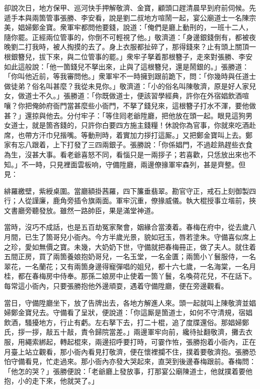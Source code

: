 卻說次日，地方保甲、巡河快手押解敬濟、金寶，顧頭口趕清晨早到府前伺候。先遞手本與兩箇管事張勝、李安看，說是劉二叔地方喧鬧一起，宴公廟道士一名陳宗美，娼婦鄭金寶。衆軍牢都問他要錢，說道：「俺們是廳上動刑的，一班十二人，隨你罷。正經兩位管事的，你倒不可輕視了他。」敬濟道：「身邊銀錢倒有，都被夜晚劉二打我時，被人掏摸的去了。身上衣服都扯碎了，那得錢來？止有頭上關頂一根銀簪兒，拔下來，與二位管事的罷。」{}衆牢子拏着那根簪子，走來對張勝、李安如此這般說：「他一箇錢兒不拏出來，止與了這根簪兒，還是鬧銀的。」張勝道：「你叫他近前，等我審問他。」衆軍牢不一時擁到跟前跪下，問：「你幾時與任道士做徒弟？俗名叫甚麼？我從未見你。」敬濟道：「小的俗名叫陳敬濟，原是好人家兒女，做道士不久。」張勝道：「你既做道士，便該習學經典，許你在外宿娼飲酒喧嚷？你把俺帥府衙門當甚麼些小衙門，不拏了錢兒來，這根簪子打水不渾，要他做甚？」還掠與他去。分付牢子：「等住囘老爺陞廳，把他放在頭一起。眼見這狗男女道士，就是箇吝錢的，只許你白要四方施主錢糧！休說你為官事，你就來吃酒赴席，也帶方汗巾兒揩嘴。等動刑時，着實加力拶打這厮。」又把鄭金寶叫上去。鄭家有忘八跟着，上下打發了三四兩銀子。張勝說：「你係娼門，不過趁熟趕些衣食為生，沒甚大事。看老爺喜怒不同，看惱只是一兩拶子；若喜歡，只恁放出來也不知。」不一時，只見裡面雲板响，守備陞廳，兩邊僚掾軍牢森列，甚是齊整。但見：

緋羅繳壁，紫綬桌圍。當廳額掛茜羅，四下簾垂翡翠。勘官守正，戒石上刻御製四行；人從謹廉，鹿角旁插令旗兩面。軍牢沉重，僚掾威儀。執大棍授事立堦前，挾文書廳旁聽發放。雖然一路帥臣，果是滿堂神道。

當時，沒巧不成話，也是五百劫冤家聚會，姻緣合當湊着。春梅在府中，從去歲八月間，已生了箇哥兒小衙內。{}今方半歲光景，貌如冠玉，唇若塗朱。守備喜似席上之珍，愛如無價之寶。未幾，大奶奶下世，守備就把春梅冊正，做了夫人。{}就住着五間正房，買了兩箇養娘抱奶哥兒，一名玉堂，一名金匱；兩箇小丫鬟服侍，一名翠花，一名蘭花；又有兩箇身邊得寵彈唱的姐兒，都十六七歲，一名海棠，一名月桂，都在春梅房中侍奉。那孫二娘房中止使着一箇丫鬟，名喚荷花兒，不在話下。每常這小衙內，只要張勝抱他外邊頑耍，遇着守備陞廳，便在旁邊觀看。

當日，守備陞廳坐下，放了告牌出去，各地方解進人來。頭一起就叫上陳敬濟並娼婦鄭金寶兒去。守備看了呈狀，便說道：「你這厮是箇道士，如何不守清規，宿娼飲酒，騷擾地方，行止有虧。左右拏下去，打二十棍，追了度牒還俗。{}那娼婦鄭氏，拶一拶，敲五十敲，責令歸院當差。」兩邊軍牢向前，纔待扯翻敬濟，攤去衣服，用繩索綁起，轉起棍來，兩邊招呼要打時，可霎作恠，張勝抱着小衙內，正在月臺上站立觀看，那小衙內看見打敬濟，便在懷裡攔不住，撲着要敬濟抱。張勝恐怕守備看見，忙走過來。那小衙內亦發大哭起來，直哭到後邊春梅跟前。春梅問：「他怎的哭？」張勝便說：「老爺廳上發放事，打那宴公廟陳道士，他就撲着要他抱，小的走下來，他就哭了。」

